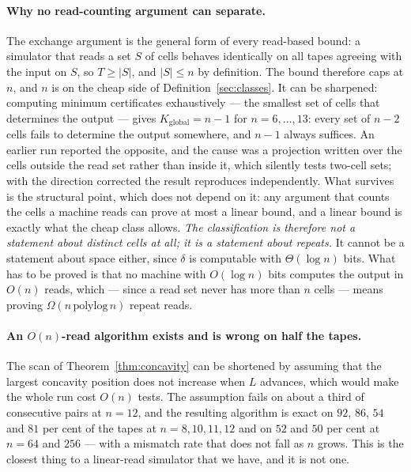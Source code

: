 \documentclass[11pt]{article}
\begin{document}
\paragraph{Why no read-counting argument can separate.} The exchange argument is the general form of
every read-based bound: a simulator that reads a set $S$ of cells behaves identically on all tapes
agreeing with the input on $S$, so $T\ge|S|$, and $|S|\le n$ by definition. The bound therefore caps
at $n$, and $n$ is on the cheap side of Definition~\ref{sec:classes}. It can be sharpened: computing minimum
certificates exhaustively --- the smallest set of cells that determines the output --- gives
$K_{\mathrm{global}}=n-1$ for $n=6,\dots,13$: every set of $n-2$ cells fails to determine the output
somewhere, and $n-1$ always suffices. An earlier run reported the opposite, and the cause was a
projection written over the cells outside the read set rather than inside it, which silently tests
two-cell sets; with the direction corrected the result reproduces independently. What survives is the structural point, which does not depend on it: any
argument that counts the cells a machine reads can prove at most a linear bound, and a linear bound
is exactly what the cheap class allows. \emph{The classification is therefore not a statement about
distinct cells at all; it is a statement about repeats.} It cannot be a statement about space
either, since $\delta$ is computable with $\Theta(\log n)$ bits. What has to be proved is that no
machine with $O(\log n)$ bits computes the output in $O(n)$ reads, which --- since a read set never
has more than $n$ cells --- means proving $\Omega(n\,\mathrm{polylog}\,n)$ repeat reads.

\paragraph{An $O(n)$-read algorithm exists and is wrong on half the tapes.} The scan of
Theorem~\ref{thm:concavity} can be shortened by assuming that the largest concavity position does not
increase when $L$ advances, which would make the whole run cost $O(n)$ tests. The assumption fails on about
a third of consecutive pairs at $n=12$, and the resulting algorithm is exact on
$92$, $86$, $54$ and $81$ per cent of the tapes at $n=8,10,11,12$ and on $52$ and $50$ per cent at
$n=64$ and $256$ --- with a mismatch rate that does not fall as $n$ grows. This is the closest thing to
a linear-read simulator that we have, and it is not one.
\end{document}
